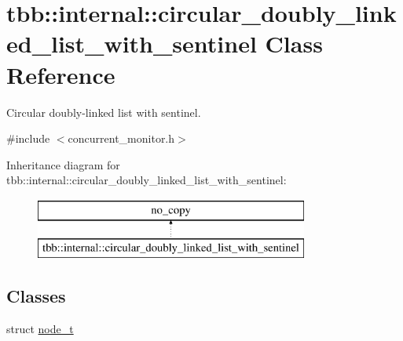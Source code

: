 \hypertarget{classtbb_1_1internal_1_1circular__doubly__linked__list__with__sentinel}{}\section{tbb\+:\+:internal\+:\+:circular\+\_\+doubly\+\_\+linked\+\_\+list\+\_\+with\+\_\+sentinel Class Reference}
\label{classtbb_1_1internal_1_1circular__doubly__linked__list__with__sentinel}


Circular doubly-\/linked list with sentinel.  




{\ttfamily \#include $<$concurrent\+\_\+monitor.\+h$>$}

Inheritance diagram for tbb\+:\+:internal\+:\+:circular\+\_\+doubly\+\_\+linked\+\_\+list\+\_\+with\+\_\+sentinel\+:\begin{figure}[H]
\begin{center}
\leavevmode
\includegraphics[height=2.000000cm]{classtbb_1_1internal_1_1circular__doubly__linked__list__with__sentinel}
\end{center}
\end{figure}
\subsection*{Classes}
\begin{DoxyCompactItemize}
\item 
struct \hyperlink{structtbb_1_1internal_1_1circular__doubly__linked__list__with__sentinel_1_1node__t}{node\+\_\+t}
\end{DoxyCompactItemize}
